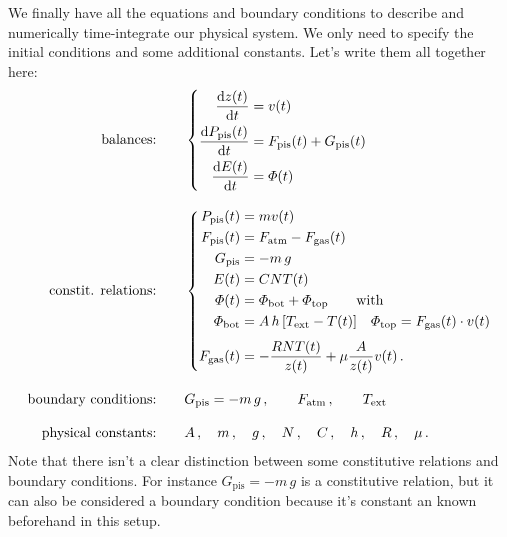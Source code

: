 \documentclass[a4paper,12pt,%
onecolumn,oneside,%
british%
]{memoir}
\newcommand*{\di}{\mathop{}\!\mathrm{d}}%
\renewcommand*{\|}[1][]{\nonscript\:#1\vert\nonscript\:\mathopen{}}
\newcommand*{\yvis}{\mu} %
\newcommand*{\yhea}{h} %
\newcommand*{\dt}{\di t}
\newcommand*{\yN}{N}
\newcommand*{\ym}{m}%
\newcommand*{\yE}{E}
\newcommand*{\yH}{\varPhi}%
\newcommand*{\yPpi}{P_{\textrm{pis}}}
\newcommand*{\yGpi}{G_{\textrm{pis}}}
\newcommand*{\yFpi}{F_{\textrm{pis}}}
\newcommand*{\yFgas}{F_{\textrm{gas}}}
\newcommand*{\yFatm}{F_{\textrm{atm}}}
\newcommand*{\yT}{T}%
\newcommand*{\yTe}{\yT_{\text{ext}}}%
\begin{document}
We finally have all the equations and boundary conditions to describe and numerically time-integrate our physical system. We only need to specify the initial conditions and some additional constants. Let's write them all together here:
\begin{equation*}
  \begin{aligned}
    \text{balances:}&\qquad\left\{
      \begin{aligned}
        \frac{\di z(t)}{\dt} &= v(t)
        \\
        \frac{\di \yPpi(t)}{\dt} &= \yFpi(t) + \yGpi(t)
        \\
        \frac{\di \yE(t)}{\dt} &= \yH(t)
      \end{aligned}
    \right.
    \\[3\jot]
    \text{constit. relations:}&\qquad\left\{
      \begin{aligned}
        \yPpi(t) &= \ym v(t)
        \\
        \yFpi(t) &= \yFatm - \yFgas(t)
        \\
        \yGpi &= -\ym\,g
        \\
        \yE(t) &= C\yN\yT(t)
        \\
        \yH(t) &= \yH_{\textrm{bot}} + \yH_{\textrm{top}}
        \qquad\text{with}
        \\
        \yH_{\textrm{bot}} &= A\,\yhea\,[\yTe-\yT(t)]
        \quad
        \yH_{\textrm{top}} =  \yFgas(t) \cdot v(t)
        \\[\jot]
        \yFgas(t) &= -\frac{R \yN \yT(t)}{z(t)}  + \yvis \frac{A}{z(t)} v(t) \,.
      \end{aligned}
    \right.
    \\[3\jot]
    \text{boundary conditions:}&\qquad
    \yGpi = -\ym\,g \,,
    \qquad
    \yFatm \,,
    \qquad
    \yTe
    \\[3\jot]
    \text{physical constants:}&\qquad
    A\,,\quad \ym \,,\quad g \,,\quad \yN \,,\quad C \,,\quad \yhea \,,\quad R \,,\quad \yvis \,.
  \end{aligned}
\end{equation*}
Note that there isn't a clear distinction between some constitutive relations and boundary conditions. For instance $\yGpi = -\ym\,g$ is a constitutive relation, but it can also be considered a boundary condition because it's constant an known beforehand in this setup.
\end{document}

